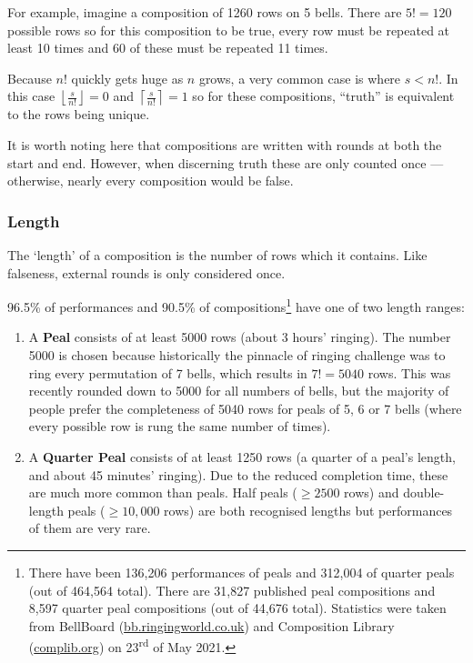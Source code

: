 \documentclass[12pt]{article}
\newcommand{\nth}[2]{#1\textsuperscript{#2}}
\begin{document}
For example, imagine a composition of 1260 rows on 5 bells.  There are $5! = 120$ possible rows so
for this composition to be true, every row must be repeated at least 10 times and 60 of these must
be repeated 11 times.

Because $n!$ quickly gets huge as $n$ grows, a very common case is where $s < n!$. In this case
$\left\lfloor \frac{s}{n!} \right\rfloor = 0$ and $\left\lceil \frac{s}{n!} \right\rceil = 1$ so
for these compositions, ``truth'' is equivalent to the rows being unique.

It is worth noting here that compositions are written with rounds at both the start and end.
However, when discerning truth these are only counted once --- otherwise, nearly every composition
would be false.

\subsubsection{Length}

The `length' of a composition is the number of rows which it contains.  Like falseness, external
rounds is only considered once.

96.5\% of performances and 90.5\% of compositions\footnote{There have been 136,206 performances of
peals and 312,004 of quarter peals (out of 464,564 total).  There are 31,827 published peal
compositions and 8,597 quarter peal compositions (out of 44,676 total).  Statistics were taken from
BellBoard (\url{bb.ringingworld.co.uk}) and Composition Library (\url{complib.org}) on \nth{23}{rd}
of May 2021.} have one of two length ranges:

\begin{enumerate}
    \item A \textbf{Peal} consists of at least 5000 rows (about 3 hours' ringing).
        The number 5000 is chosen because historically the pinnacle of ringing challenge was to ring
        every permutation of 7 bells, which results in $7! = 5040$ rows.  This was recently rounded
        down to 5000 for all numbers of bells, but the majority of people prefer the completeness of
        5040 rows for peals of 5, 6 or 7 bells (where every possible row is rung the same number of
        times).
    \item A \textbf{Quarter Peal} consists of at least 1250 rows (a quarter of a peal's length, and
        about 45 minutes' ringing).  Due to the reduced completion time, these are much more
        common than peals.  Half peals ($\ge 2500$ rows) and double-length peals ($\ge 10,000$ rows)
        are both recognised lengths but performances of them are very rare.
\end{enumerate}
\end{document}
